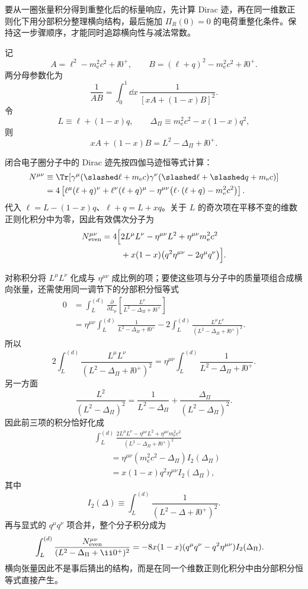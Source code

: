 \begin{derivation}
要从一圈张量积分得到重整化后的标量响应，先计算 Dirac 迹，再在同一维数正则化下用分部积分整理横向结构，最后施加 $\Pi_R(0)=0$ 的电荷重整化条件。保持这一步骤顺序，才能同时追踪横向性与减法常数。

记
\[
 A=\ell^2-m_{\mathrm e}^2c^2+\ii0^+,
 \qquad
 B=(\ell+q)^2-m_{\mathrm e}^2c^2+\ii0^+ .
\]
两分母参数化为
\[
 \frac1{AB}=\int_0^1\dd x\,
 \frac1{[xA+(1-x)B]^2}.
\]
令
\[
 L\equiv \ell+(1-x)q,
 \qquad
 \Delta_\Pi\equiv m_{\mathrm e}^2c^2-x(1-x)q^2,
\]
则
\[
 xA+(1-x)B=L^2-\Delta_\Pi+\ii0^+.
\]

闭合电子圈分子中的 Dirac 迹先按四伽马迹恒等式计算：
\begin{align*}
N^{\mu\nu}
&\equiv
\Tr\!\left[
\gamma^\mu(\slashed\ell+m_{\mathrm e} c)
\gamma^\nu(\slashed\ell+\slashed q+m_{\mathrm e} c)
\right]\\
&=4\left[
\ell^\mu(\ell+q)^\nu
+\ell^\nu(\ell+q)^\mu
-\eta^{\mu\nu}
\bigl(\ell\!\cdot(\ell+q)-m_{\mathrm e}^2c^2\bigr)
\right].
\end{align*}
代入
$\ell=L-(1-x)q$、$\ell+q=L+xq$。关于 $L$ 的奇次项在平移不变的维数正则化积分中为零，因此有效偶次分子为
\begin{align*}
N_{\rm even}^{\mu\nu}
=4\Bigl[
&2L^\mu L^\nu-\eta^{\mu\nu}L^2
+\eta^{\mu\nu}m_{\mathrm e}^2c^2\\
&+x(1-x)
\bigl(q^2\eta^{\mu\nu}-2q^\mu q^\nu\bigr)
\Bigr].
\end{align*}

对称积分将 $L^\mu L^\nu$ 化成与 $\eta^{\mu\nu}$ 成比例的项；要使这些项与分子中的质量项组合成横向张量，还需使用同一调节下的分部积分恒等式
\begin{align*}
0
&=\int_L^{(d)}
\frac{\partial}{\partial L_\mu}
\left[
\frac{L^\nu}{L^2-\Delta_\Pi+\ii0^+}
\right]\\
&=\eta^{\mu\nu}
\int_L^{(d)}\frac1{L^2-\Delta_\Pi+\ii0^+}
-2\int_L^{(d)}
\frac{L^\mu L^\nu}
{(L^2-\Delta_\Pi+\ii0^+)^2}.
\end{align*}
所以
\[
2\int_L^{(d)}
\frac{L^\mu L^\nu}{(L^2-\Delta_\Pi+\ii0^+)^2}
=\eta^{\mu\nu}
\int_L^{(d)}\frac1{L^2-\Delta_\Pi+\ii0^+}.
\]
另一方面
\[
\frac{L^2}{(L^2-\Delta_\Pi)^2}
=\frac1{L^2-\Delta_\Pi}
+\frac{\Delta_\Pi}{(L^2-\Delta_\Pi)^2}.
\]
因此前三项的积分恰好化成
\begin{align*}
&\int_L^{(d)}
\frac{2L^\mu L^\nu-\eta^{\mu\nu}L^2
+\eta^{\mu\nu}m_{\mathrm e}^2c^2}
{(L^2-\Delta_\Pi+\ii0^+)^2}\\
&\qquad
=\eta^{\mu\nu}
(m_{\mathrm e}^2c^2-\Delta_\Pi)
I_2(\Delta_\Pi)\\
&\qquad
=x(1-x)q^2\eta^{\mu\nu}I_2(\Delta_\Pi),
\end{align*}
其中
\[
I_2(\Delta)
\equiv
\int_L^{(d)}\frac1{(L^2-\Delta+\ii0^+)^2}.
\]
再与显式的 $q^\mu q^\nu$ 项合并，整个分子积分成为
\begin{align*}
\int_L^{(d)}
\frac{N_{\rm even}^{\mu\nu}}
{(L^2-\Delta_\Pi+\ii0^+)^2}
&=-8x(1-x)
(q^\mu q^\nu-q^2\eta^{\mu\nu})
I_2(\Delta_\Pi).
\end{align*}
横向张量因此不是事后猜出的结构，而是在同一个维数正则化积分中由分部积分恒等式直接产生。


\end{derivation}
